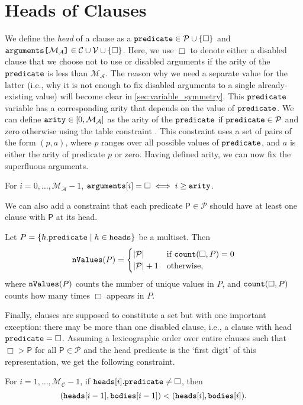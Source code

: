 \documentclass[runningheads]{llncs}
\newcommand{\variable}[1]{\texttt{\textup{#1}}}
\newcommand{\arrayd}[3]{\variable{{#1}[}{#2}\variable{]} \in {#3}}
\newcommand{\predicates}{\mathcal{P}}
\newcommand{\variables}{\mathcal{V}}
\newcommand{\constants}{\mathcal{C}}
\newcommand{\maxArity}{\mathcal{M}_{\mathcal{A}}}
\newcommand{\maxNumClauses}{\mathcal{M}_{\mathcal{C}}}
\begin{document}
\section{Heads of Clauses} \label{sec:heads}

We define the \emph{head} of a clause as a $\variable{predicate} \in \predicates{}
\cup \{ \Box \}$ and $\arrayd{arguments}{\maxArity{}}{\constants{} \cup
  \variables{}} \cup \{ \Box \}$. Here, we use $\Box$ to denote either a
disabled clause that we choose not to use or disabled arguments if the arity of
the $\variable{predicate}$ is less than $\maxArity{}$. The reason why we need a
separate value for the latter (i.e., why it is not enough to fix disabled
arguments to a single already-existing value) will become clear in
\cref{sec:variable_symmetry}. This $\variable{predicate}$ variable has a
corresponding arity that depends on the value of $\variable{predicate}$. We can
define $\variable{arity} \in [0, \maxArity{}]$ as the arity of the
$\variable{predicate}$ if $\variable{predicate} \in \predicates{}$ and zero
otherwise using the table constraint \cite{DBLP:conf/cpaior/MairyDL15}. This
constraint uses a set of pairs of the form $(p, a)$, where $p$ ranges over all
possible values of $\variable{predicate}$, and $a$ is either the arity of
predicate $p$ or zero. Having defined arity, we can now fix the superfluous
arguments.
\begin{constraint} \label{constr:arity}
  For $i = 0, \dots, \maxArity{} - 1$, $\variable{arguments}[i] = \Box \iff i
  \ge \variable{arity}$.
\end{constraint}
We can also add a constraint that each predicate $\mathsf{P} \in \predicates{}$
should have at least one clause with $\mathsf{P}$ at its head.
\begin{constraint}
  Let $P = \{ h.\variable{predicate} \mid h \in \variable{heads} \}$ be a
  multiset. Then
  \[
    \variable{nValues}(P) = \begin{cases}
      |\predicates{}| & \text{if } \variable{count}(\Box, P) = 0 \\
      |\predicates{}| + 1 & \text{otherwise,}
    \end{cases}
  \]
  where $\variable{nValues}(P)$ counts the number of unique values in $P$, and
  $\variable{count}(\Box, P)$ counts how many times $\Box$ appears in $P$.
\end{constraint}
Finally, clauses are supposed to constitute a set but with one important
exception: there may be more than one disabled clause, i.e., a clause with head
$\variable{predicate} = \Box$. Assuming a lexicographic order over entire
clauses such that $\Box > \mathsf{P}$ for all $\mathsf{P} \in \predicates{}$ and
the head predicate is the `first digit' of this representation, we get the
following constraint.
\begin{constraint}
  For $i = 1, \dots, \maxNumClauses{} - 1$, if $\variable{heads}[i].\variable{predicate}
  \ne \Box$, then
  \[
    (\variable{heads}[i-1], \variable{bodies}[i-1]) < (\variable{heads}[i],
    \variable{bodies}[i]).
  \]
\end{constraint}
\end{document}
